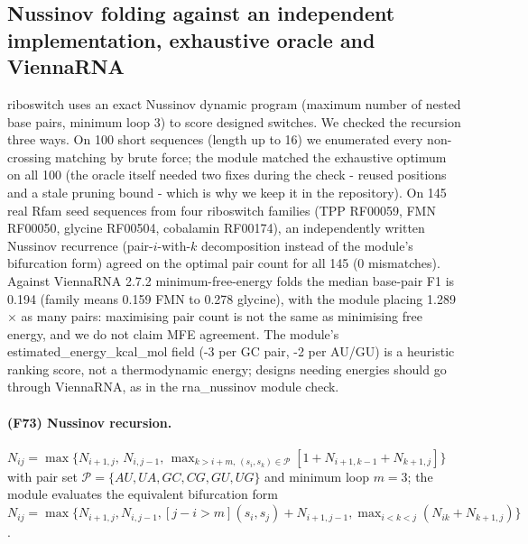 \subsection{Nussinov folding against an independent implementation, exhaustive oracle and ViennaRNA}
riboswitch uses an exact Nussinov dynamic program (maximum number of nested base pairs, minimum loop 3) to score designed switches. We checked the recursion three ways. On 100 short sequences (length up to 16) we enumerated every non-crossing matching by brute force; the module matched the exhaustive optimum on all 100 (the oracle itself needed two fixes during the check - reused positions and a stale pruning bound - which is why we keep it in the repository). On 145 real Rfam seed sequences from four riboswitch families (TPP RF00059, FMN RF00050, glycine RF00504, cobalamin RF00174), an independently written Nussinov recurrence (pair-$i$-with-$k$ decomposition instead of the module's bifurcation form) agreed on the optimal pair count for all 145 (0 mismatches). Against ViennaRNA 2.7.2 minimum-free-energy folds the median base-pair F1 is 0.194 (family means 0.159 FMN to 0.278 glycine), with the module placing 1.289$\times$ as many pairs: maximising pair count is not the same as minimising free energy, and we do not claim MFE agreement. The module's estimated\_energy\_kcal\_mol field (-3 per GC pair, -2 per AU/GU) is a heuristic ranking score, not a thermodynamic energy; designs needing energies should go through ViennaRNA, as in the rna\_nussinov module check.
\paragraph{(F73) Nussinov recursion.} $N_{ij}=\max\{N_{i+1,j},\,N_{i,j-1},\,\max_{k>i+m,\,(s_i,s_k)\in\mathcal P}[1+N_{i+1,k-1}+N_{k+1,j}]\}$ with pair set $\mathcal P=\{AU,UA,GC,CG,GU,UG\}$ and minimum loop $m=3$; the module evaluates the equivalent bifurcation form $N_{ij}=\max\{N_{i+1,j},N_{i,j-1},[j-i>m](s_i,s_j)+N_{i+1,j-1},\max_{i<k<j}(N_{ik}+N_{k+1,j})\}$.
